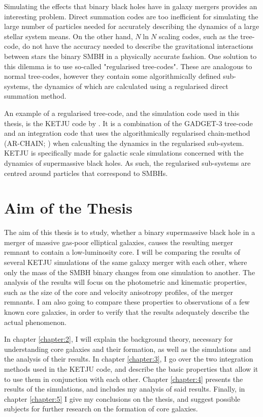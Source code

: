 \documentclass[english, twoside]{HYgradu}
\begin{document}
Simulating the effects that binary black holes have in galaxy mergers provides an interesting problem. Direct summation codes are too inefficient for simulating the large number of particles needed for accurately describing the dynamics of a large stellar system means. On the other hand, $N \ln N$ scaling codes, such as the tree-code, do not have the accuracy needed to describe the gravitational interactions between stars the binary SMBH in a physically accurate fashion. One solution to this dilemma is to use so-called "regularised tree-codes". These are analogous to normal tree-codes, however they contain some algorithmically defined sub-systems, the dynamics of which are calculated using a regularised direct summation method.

An example of a regularised tree-code, and the simulation code used in this thesis, is the KETJU code by \cite{Rantala2017KETJU}. It is a combination of the GADGET-3 tree-code \citep{Springel2005} and an integration code that uses the algorithmically regularised chain-method (AR-CHAIN; \citealt{Mikkola2008ARCHAIN}) when calcualting the dynamics in the regularised sub-system. KETJU is specifically made for galactic scale simulations concerned with the dynamics of supermassive black holes. As such, the regularised sub-systems are centred around particles that correspond to SMBHs.

\section{Aim of the Thesis}

The aim of this thesis is to study, whether a binary supermassive black hole in a merger of massive gas-poor elliptical galaxies, causes the resulting merger remnant to contain a low-luminosity core. I will be comparing the results of several KETJU simulations of the same galaxy merger with each other, where only the mass of the SMBH binary changes from one simulation to another. The analysis of the results will focus on the photometric and kinematic properties, such as the size of the core and velocity anisotropy profiles, of the merger remnants. I am also going to compare these properties to observations of a few known core galaxies, in order to verify that the results adequately describe the actual phenomenon.

In chapter \ref{chapter:2}, I will explain the background theory, necessary for understanding core galaxies and their formation, as well as the simulations and the analysis of their results. In chapter \ref{chapter:3}, I go over the two integration methods used in the KETJU code, and describe the basic properties that allow it to use them in conjunction with each other. Chapter \ref{chapter:4} presents the results of the simulations, and includes my analysis of said results. Finally, in chapter \ref{chapter:5} I give my conclusions on the thesis, and suggest possible subjects for further research on the formation of core galaxies.
\end{document}
